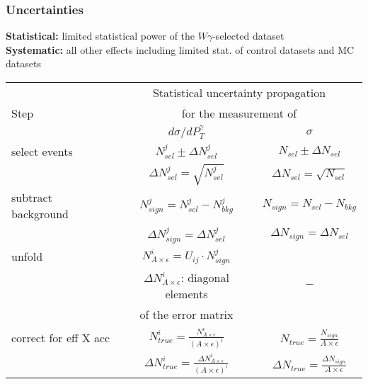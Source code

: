 \begin{frame}\frametitle{Uncertainties}
\scriptsize{\bfseries{Statistical:}} \tiny{limited statistical power of the $W\gamma$-selected dataset}\\
\scriptsize{\bfseries{Systematic:}} \tiny{all other effects including limited stat. of control datasets and MC datasets}\\

  \begin{table}[h]
  \tiny
  \begin{center}
  \begin{tabular}{|l|c|c|}
    \hline
          & \multicolumn{2}{|c|}{Statistical uncertainty propagation} \\ 
     Step & \multicolumn{2}{|c|}{for the measurement of} \\
          & $d\sigma/dP_{T}^{\gamma}$ & $\sigma$ \\ \hline

    select events & $N_{sel}^j \pm \Delta N_{sel}^j$ &    $N_{sel} \pm \Delta N_{sel}$       \\ 
                  & {\color{blue}$\Delta N_{sel}^j = \sqrt{N_{sel}^j}$} &  {\color{blue}$\Delta N_{sel} = \sqrt{N_{sel}}$}   \\ \hline

    subtract background & $N_{sign}^j = N_{sel}^j - N_{bkg}^j$ &    $N_{sign}=N_{sel}-N_{bkg}$       \\ 
                        & {\color{blue}$\Delta N_{sign}^j = \Delta N_{sel}^j$} &    {\color{blue}$\Delta N_{sign} = \Delta N_{sel}$}   \\ \hline

    unfold   & $N_{A\times\epsilon}^i = U_{ij} \cdot N_{sign}^j$ &           \\ 
             & {\color{blue}$\Delta N_{A\times\epsilon}^i$: diagonal elements} &    $-$       \\ 
             & {\color{blue}of the error matrix} &           \\ \hline

    correct for eff X acc & $N_{true}^i = \frac{N_{A\times\epsilon}^i}{(A \times\epsilon)^i}$ &  $N_{true}=\frac{N_{sign}}{A\times\epsilon}$       \\ 
                          & {\color{blue}$\Delta N_{true}^i = \frac{\Delta N_{A\times\epsilon}^i}{(A \times\epsilon)^i}$} &  {\color{blue}$\Delta N_{true}=\frac{\Delta N_{sign}}{A\times\epsilon}$}       \\ \hline


\end{tabular}
\end{center}
\end{table}
\end{frame}
